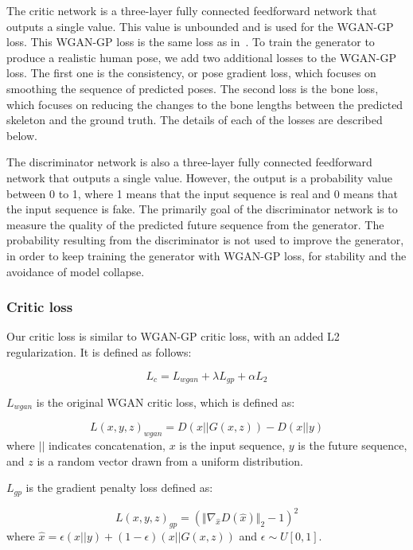 \documentclass[10pt,twocolumn,letterpaper]{article}
\begin{document}
The critic network is a three-layer fully connected feedforward network that outputs a single value. This value is unbounded and is used for the WGAN-GP loss. This WGAN-GP loss is the same loss as in~\cite{corr2017:Ishaan}. To train the generator to produce a realistic human pose, we add two additional losses to the WGAN-GP loss. The first one is the consistency, or pose gradient loss, which focuses on smoothing the sequence of predicted poses. The second loss is the bone loss, which focuses on reducing the changes to the bone lengths between the predicted skeleton and the ground truth.  The details of each of the losses are described below.

The discriminator network is also a three-layer fully connected feedforward network that outputs a single value. However, the output is a probability value between 0 to 1, where 1 means that the input sequence is real and 0 means that the input sequence is fake. The primarily goal of the discriminator network is to measure the quality of the predicted future sequence from the generator. The probability resulting from the discriminator is not used to improve the generator, in order to keep training the generator with WGAN-GP loss, for stability and the avoidance of model collapse. 



\subsubsection{Critic loss}

Our critic loss is similar to WGAN-GP critic loss, with an added L2 regularization. It is defined as follows:

\begin{equation}
L_{c}=L_{wgan}+\lambda L_{gp}+\alpha L_{2}
\label{eq:critic_total_loss}
\end{equation}

$L_{wgan}$ is the original WGAN critic loss, which is defined as:

\begin{equation}
L(x,y,z)_{wgan}=D(x||G(x,z))-D(x||y)
\label{eq:critic_loss}
\end{equation}
where $||$ indicates concatenation, $x$ is the input sequence, $y$ is the future sequence, and $z$ is a random vector drawn from a uniform distribution. 

$L_{gp}$ is the gradient penalty loss defined as:

\begin{equation}
L(x,y,z)_{gp}=(\Vert\nabla_{\hat{x}}D(\hat{x})\Vert_{2} - 1)^{2}
\label{eq:gradient_penalty}
\end{equation}
where $\hat{x}=\epsilon (x||y)+(1-\epsilon)(x||G(x,z))$ and $\epsilon
\sim U[0, 1]$.
\end{document}
